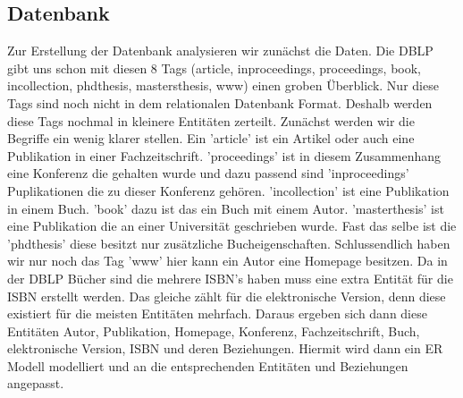 \subsection{Datenbank}
Zur Erstellung der Datenbank analysieren wir zunächst die Daten. Die DBLP gibt uns schon mit diesen 8 Tags (article, inproceedings, proceedings, book, incollection, phdthesis, mastersthesis, www) einen groben Überblick. Nur diese Tags sind noch nicht in dem relationalen Datenbank Format. Deshalb werden diese Tags nochmal in kleinere Entitäten zerteilt. Zunächst werden wir die Begriffe ein wenig klarer stellen. Ein 'article' ist ein Artikel oder auch eine Publikation in einer Fachzeitschrift. 'proceedings' ist in diesem Zusammenhang eine Konferenz die gehalten wurde und dazu passend sind 'inproceedings' Puplikationen die zu dieser Konferenz gehören. 'incollection' ist eine Publikation in einem Buch. 'book' dazu ist das ein Buch mit einem Autor. 'masterthesis' ist eine Publikation die an einer Universität geschrieben wurde. Fast das selbe ist die 'phdthesis' diese besitzt nur zusätzliche Bucheigenschaften. Schlussendlich haben wir nur noch das Tag 'www' hier kann ein Autor eine Homepage besitzen. Da in der DBLP Bücher sind die mehrere ISBN's haben muss eine extra Entität für die ISBN erstellt werden. Das gleiche zählt für die elektronische Version, denn diese existiert für die meisten Entitäten mehrfach. Daraus ergeben sich dann diese Entitäten Autor, Publikation, Homepage, Konferenz, Fachzeitschrift, Buch, elektronische Version, ISBN und deren Beziehungen. Hiermit wird dann ein ER Modell modelliert und an die entsprechenden Entitäten und Beziehungen angepasst. 

\newpage
